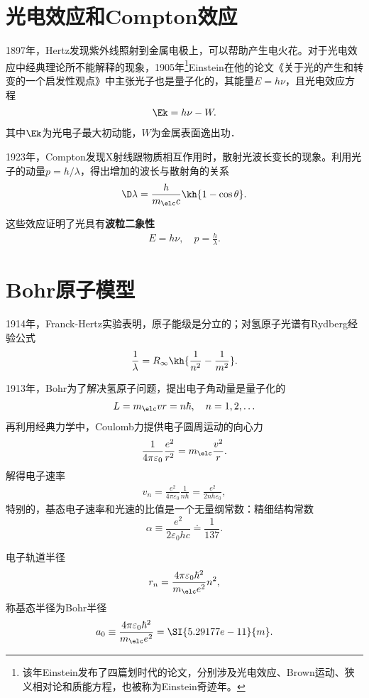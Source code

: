 \section{光电效应和Compton效应}
1897年，Hertz发现紫外线照射到金属电极上，可以帮助产生电火花。对于光电效应中经典理论所不能解释的现象，1905年\footnote{该年Einstein发布了四篇划时代的论文，分别涉及光电效应、Brown运动、狭义相对论和质能方程，也被称为Einstein奇迹年。}Einstein在他的论文《关于光的产生和转变的一个启发性观点》中主张光子也是量子化的，其能量$E=h\nu$，且光电效应方程
\begin{align}
	\Ek=h\nu-W.
\end{align}
其中$\Ek$为光电子最大初动能，$W$为金属表面逸出功．

1923年，Compton发现X射线跟物质相互作用时，散射光波长变长的现象。利用光子的动量$p=h/\lambda$，得出增加的波长与散射角的关系
\begin{align}
	\D\lambda=\frac h{m_\elc c}\kh{1-\cos\theta}.
\end{align}

这些效应证明了光具有\textbf{波粒二象性}
\begin{align}
	E=h\nu,\quad p=\frac h\lambda.
\end{align}
\section{Bohr原子模型}
1914年，Franck-Hertz实验表明，原子能级是分立的；对氢原子光谱有Rydberg经验公式
\begin{align}
	\frac1\lambda=R_\infty\kh{\frac1{n^2}-\frac1{m^2}}.
\end{align}

1913年，Bohr为了解决氢原子问题，提出电子角动量是量子化的
\begin{align}
	L=m_\elc vr=n\hbar,\quad n=1,2,\ldots
\end{align}
再利用经典力学中，Coulomb力提供电子圆周运动的向心力
\[
	\frac1{4\pi\varepsilon_0}\frac{e^2}{r^2}=m_\elc\frac{v^2}r.
\]
解得电子速率
\begin{align}
	v_n=\frac{e^2}{4\pi\varepsilon_0}\frac{1}{n\hbar}=\frac{e^2}{2nh\varepsilon_0},
\end{align}
特别的，基态电子速率和光速的比值是一个无量纲常数：精细结构常数
\[
	\alpha\equiv\frac{e^2}{2\varepsilon_0 hc}\doteq\frac1{137}.
\]

电子轨道半径
\begin{align}
	r_n=\frac{4\pi\varepsilon_0\hbar^2}{m_\elc e^2}n^2,
\end{align}
称基态半径为Bohr半径
\[
a_0\equiv\frac{4\pi\varepsilon_0\hbar^2}{m_\elc e^2}=\SI{5.29177e-11}{m}.
\]

